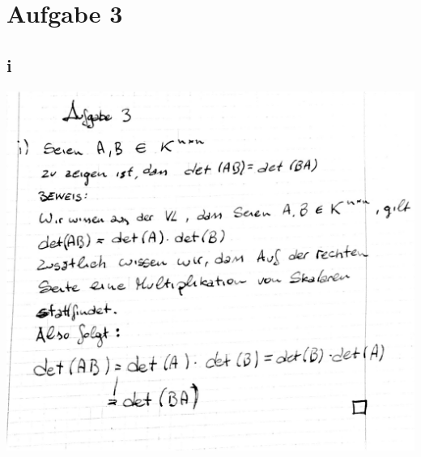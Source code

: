 \documentclass[10pt,a4paper]{article}
\begin{document}
\section{Aufgabe 3}
\subsection{i}
\includegraphics[scale=0.2]{la_t12_4.jpg} \\
\end{document}
